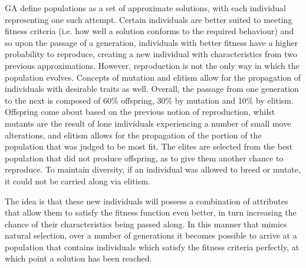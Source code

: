 \documentclass[UKenglish]{libraries/svproc}
\begin{document}
GA define populations as a set of approximate solutions, with each individual representing one such attempt. Certain individuals are better suited to meeting fitness criteria (i.e. how well a solution conforms to the required behaviour) and so upon the passage of a generation, individuals with better fitness have a higher probability to reproduce, creating a new individual with characteristics from two previous approximations. However, reproduction is not the only way in which the population evolves. Concepts of mutation and elitism allow for the propagation of individuals with desirable traits as well. Overall, the passage from one generation to the next is composed of 60\% offspring, 30\% by mutation and 10\% by elitism. Offspring come about based on the previous notion of reproduction, whilst mutants are the result of lone individuals experiencing a number of small move alterations, and elitism allows for the propagation of the portion of the population that was judged to be most fit. The elites are selected from the best population that did not produce offspring, as to give them another chance to reproduce. To maintain diversity, if an individual was allowed to breed or mutate, it could not be carried along via elitism.

The idea is that these new individuals will possess a combination of attributes that allow them to satisfy the fitness function even better, in turn increasing the chance of their characteristics being passed along. In this manner that mimics natural selection, over a number of generations it becomes possible to arrive at a population that contains individuals which satisfy the fitness criteria perfectly, at which point a solution has been reached.
\end{document}
